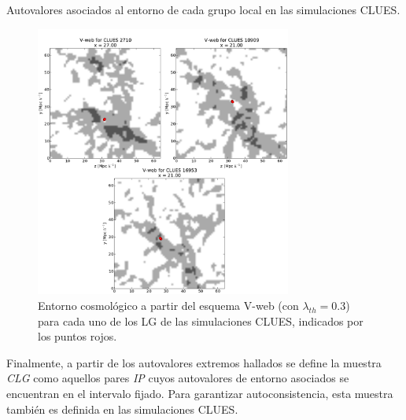 \begin{itemize}
\begin{table}[htbp]
\begin{flushright}
\begin{minipage}[r]{0.9\textwidth}
\begin{small}
  \caption{Autovalores asociados al entorno de cada grupo local en las simulaciones CLUES.}  
  \label{tab:Lambdas_LG}
\end{small}
\end{minipage}
\end{flushright}
\end{table}


\begin{figure}[htbp]
\begin{flushright}
\begin{minipage}[r]{0.9\textwidth}
	\centering
	\includegraphics[width=0.75\textwidth]
	{./figures/3_nbody_simulations/LG_Environment.png}

	\caption{\small{Entorno cosmológico a partir del esquema V-web (con 
	$\lambda_{th} = 0.3$) para 	cada uno de los LG de las simulaciones 
	CLUES, indicados por los puntos	rojos.}}
	\label{fig:LG_Sample_Environment}
\end{minipage}
\end{flushright}
\end{figure}


Finalmente, a partir de los autovalores extremos hallados se define la 
muestra \textit{CLG} como aquellos pares \textit{IP} cuyos autovalores 
de entorno asociados se encuentran en el intervalo fijado. Para garantizar
autoconsistencia, esta muestra también es definida en las simulaciones 
CLUES.

\end{itemize}


